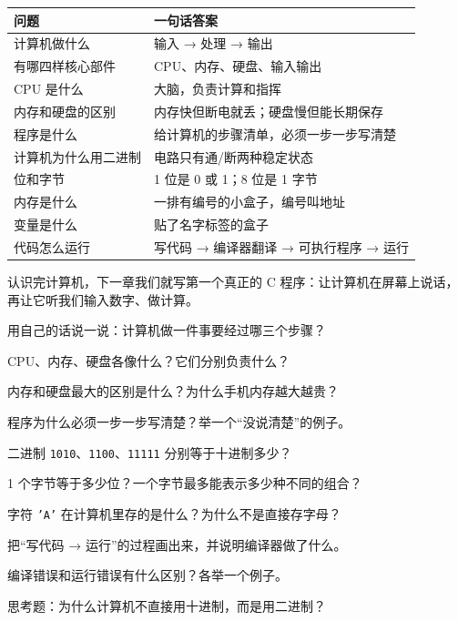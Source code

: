 \begin{center}
\begin{tabular}{@{}p{}p{}@{}}
\toprule
问题 & 一句话答案 \\
\midrule
计算机做什么 & 输入 → 处理 → 输出 \\
有哪四样核心部件 & CPU、内存、硬盘、输入输出 \\
CPU 是什么 & 大脑，负责计算和指挥 \\
内存和硬盘的区别 & 内存快但断电就丢；硬盘慢但能长期保存 \\
程序是什么 & 给计算机的步骤清单，必须一步一步写清楚 \\
计算机为什么用二进制 & 电路只有通/断两种稳定状态 \\
位和字节 & 1 位是 0 或 1；8 位是 1 字节 \\
内存是什么 & 一排有编号的小盒子，编号叫地址 \\
变量是什么 & 贴了名字标签的盒子 \\
代码怎么运行 & 写代码 → 编译器翻译 → 可执行程序 → 运行 \\
\bottomrule
\end{tabular}
\end{center}

\begin{tipbox}[下一章预告]
认识完计算机，下一章我们就写第一个真正的 C 程序：让计算机在屏幕上说话，再让它听我们输入数字、做计算。
\end{tipbox}

\begin{problemset}
  \item 用自己的话说一说：计算机做一件事要经过哪三个步骤？
  \item CPU、内存、硬盘各像什么？它们分别负责什么？
  \item 内存和硬盘最大的区别是什么？为什么手机内存越大越贵？
  \item 程序为什么必须一步一步写清楚？举一个“没说清楚”的例子。
  \item 二进制 \texttt{1010}、\texttt{1100}、\texttt{11111} 分别等于十进制多少？
  \item 1 个字节等于多少位？一个字节最多能表示多少种不同的组合？
  \item 字符 \texttt{'A'} 在计算机里存的是什么？为什么不是直接存字母？
  \item 把“写代码 → 运行”的过程画出来，并说明编译器做了什么。
  \item 编译错误和运行错误有什么区别？各举一个例子。
  \item 思考题：为什么计算机不直接用十进制，而是用二进制？
\end{problemset}
